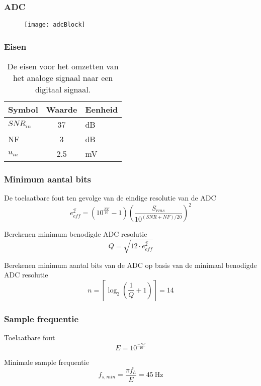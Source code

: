 \begin{frame}
    \frametitle{ADC}
    
    \begin{figure}
        \centering
        \texttt{[image: adcBlock]}
    \end{figure}

\end{frame}

\begin{frame}
    \frametitle{Eisen}

    \begin{table}[ht]
        \centering
        \begin{tabular}{l|c|l}
            Symbol      & Waarde & Eenheid\\\hline
            $SNR_{in}$  & 37        & dB\\
            NF          & 3         & dB\\
            $u_{in}$    & 2.5       & mV\\
        \end{tabular}
        \caption{De eisen voor het omzetten van het analoge signaal naar een digitaal signaal.}
        \label{tab:systemSpecADC}
    \end{table}
    
\end{frame}
\begin{frame}
    \frametitle{Minimum aantal bits}
    \centering

    De toelaatbare fout ten gevolge van de eindige resolutie van de ADC
    \begin{equation}\label{eq:calcSpecifiedRmsError}
        \overline{e_{eff}^2}=\left(10^{\frac{NF}{10}}-1\right)\left(\frac{S_{rms}}{10^{\left(SNR+NF\right)/20}}\right)^2
    \end{equation}
    \pause

    Berekenen minimum benodigde ADC resolutie
    \begin{equation}\label{eq:calcNeededQ}
        Q=\sqrt{12\cdot\overline{e_{eff}^2}}
    \end{equation}
    \pause

    Berekenen minimum aantal bits van de ADC op basis van de minimaal benodigde ADC resolutie 
    \begin{equation}\label{eq:calcMinNumberADCbits}
        n=\left\lceil\log_2\left(\frac{1}{Q}+1\right)\right\rceil=14
    \end{equation}

\end{frame}

\begin{frame}
    \frametitle{Sample frequentie}
    \centering
    
    Toelaatbare fout
    \begin{equation}\label{eq:ADCmaxSampleError}
        E=10^{\frac{-NF}{10}}
    \end{equation}
    \pause

    Minimale sample frequentie
    \begin{equation}\label{eq:ADCminFs}
        f_{s,min}=\frac{\pi f_h}{E}= \qty{45}{\hertz}
    \end{equation}

\end{frame}
